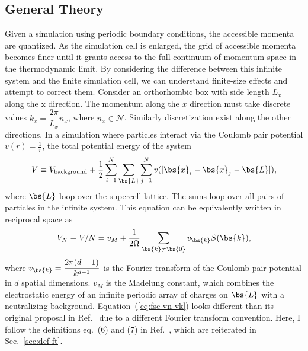 \subsection{General Theory}
Given a simulation using periodic boundary conditions, the accessible momenta are quantized. As the simulation cell is enlarged, the grid of accessible momenta becomes finer until it grants access to the full continuum of momentum space in the thermodynamic limit. By considering the difference between this infinite system and the finite simulation cell, we can understand finite-size effects and attempt to correct them.
Consider an orthorhombic box with side length $L_x$ along the x direction. The momentum along the $x$ direction must take discrete values $k_x=\dfrac{2\pi}{L_x}n_x$, where $n_x\in\mathcal{N}$. Similarly discretization exist along the other directions.
In a simulation where particles interact via the Coulomb pair potential $v(r)=\frac{1}{r}$, the total potential energy of the system %
\begin{align}
V \equiv V_{\text{background}} +
\frac{1}{2}\sum\limits_{i=1}^N
\sum\limits_{\bs{L}}\sum\limits_{j=1}^N
v(\vert\bs{x}_i-\bs{x}_j-\bs{L}\vert),
\end{align}
where $\bs{L}$ loop over the supercell lattice.
The sums loop over all pairs of particles in the infinite system.
This equation can be equivalently written in reciprocal space as
\begin{align} \label{eq:fsc-vn-vk}
V_N \equiv V/N = v_M + \frac{1}{2\Omega} \sum\limits_{\bs{k}\neq\bs{0}} v_{\bs{k}} S(\bs{k}),
\end{align}
where $v_{\bs{k}}=\dfrac{2\pi (d-1)}{k^{d-1}}$ is the Fourier transform of the Coulomb pair potential in $d$ spatial dimensions. $v_M$ is the Madelung constant, which combines the electrostatic energy of an infinite periodic array of charges on $\bs{L}$ with a neutralizing background. Equation~(\ref{eq:fsc-vn-vk}) looks different than its original proposal in Ref.~\cite{Chiesa2006} due to a different Fourier transform convention. Here, I follow the definitions eq.~(6) and (7) in Ref.~\cite{Holzmann2016}, which are reiterated in Sec.~\ref{sec:def-ft}.

